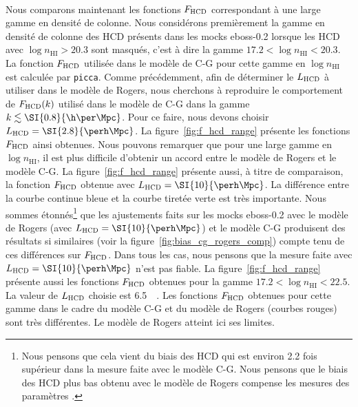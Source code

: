\paragraph{}
Nous comparons maintenant les fonctions $F_{\textsc{HCD}}$ correspondant à une large gamme en densité de colonne.
Nous considérons premièrement la gamme en densité de colonne des HCD présents dans les mocks eboss-0.2 lorsque les HCD avec $\log n_{\mathrm{HI}} > \num{20.3}$ sont masqués, c'est à dire la gamme $\num{17.2} < \log n_{\mathrm{HI}} < \num{20.3}$. 
La fonction $F_{\textsc{HCD}}$ utilisée dans le modèle de C-G pour cette gamme en $\log n_{\mathrm{HI}}$ est calculée par \texttt{picca}.
Comme précédemment, afin de déterminer le $L_{\textsc{HCD}}$ à utiliser dans le modèle de Rogers, nous cherchons à reproduire le comportement de $F_{\textsc{HCD}}(k)$ utilisé dans le modèle de C-G dans la gamme $k \lesssim \SI{0.8}{\h\per\Mpc}$. Pour ce faire, nous devons choisir $L_{\textsc{HCD}} = \SI{2.8}{\perh\Mpc}$.
La figure~\ref{fig:f_hcd_range} présente les fonctions $F_{\textsc{HCD}}$ ainsi obtenues. Nous pouvons remarquer que pour une large gamme en $\log n_{\mathrm{HI}}$, il est plus difficile d'obtenir un accord entre le modèle de Rogers et le modèle C-G.
La figure~\ref{fig:f_hcd_range} présente aussi, à titre de comparaison, la  fonction $F_{\textsc{HCD}}$ obtenue avec $L_{\textsc{HCD}} = \SI{10}{\perh\Mpc}$.
La différence entre la courbe continue bleue et la courbe tiretée verte est très importante. Nous sommes étonnés\footnote{Nous pensons que cela vient du biais des HCD qui est environ \num{2.2} fois supérieur dans la mesure faite avec le modèle C-G. Nous pensons que le biais des HCD plus bas obtenu avec le modèle de Rogers compense les mesures des paramètres \lya{}.} que les ajustements faits sur les mocks eboss-0.2 avec le modèle de Rogers (avec $L_{\textsc{HCD}} = \SI{10}{\perh\Mpc}$) et le modèle C-G produisent des résultats si similaires (voir la figure~\ref{fig:bias_cg_rogers_comp}) compte tenu de ces différences sur $F_{\textsc{HCD}}$.
  Dans tous les cas, nous pensons que la mesure faite avec $L_{\textsc{HCD}} = \SI{10}{\perh\Mpc}$ n'est pas fiable.
La figure~\ref{fig:f_hcd_range} présente aussi les fonctions $F_{\textsc{HCD}}$ obtenues pour la gamme $\num{17.2} < \log n_{\mathrm{HI}} < \num{22.5}$. La valeur de $L_{\textsc{HCD}}$ choisie est \SI{6.5}{\perh\Mpc}. Les fonctions $F_{\textsc{HCD}}$ obtenues pour cette gamme dans le cadre du modèle C-G et du modèle de Rogers (courbes rouges) sont très différentes. Le modèle de Rogers atteint ici ses limites.


